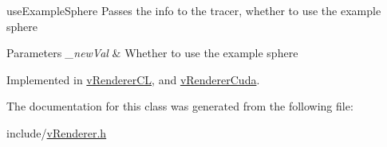 use\-Example\-Sphere Passes the info to the tracer, whether to use the example sphere 


\begin{DoxyParams}{Parameters}
{\em \-\_\-new\-Val} & Whether to use the example sphere \\
\hline
\end{DoxyParams}


Implemented in \hyperlink{classvRendererCL_ace3572b0e58f9ef81ad3853a719d8537}{v\-Renderer\-C\-L}, and \hyperlink{classvRendererCuda_ab552724c473de30893fe9dc21ee2c961}{v\-Renderer\-Cuda}.



The documentation for this class was generated from the following file\-:\begin{DoxyCompactItemize}
\item 
include/\hyperlink{vRenderer_8h}{v\-Renderer.\-h}\end{DoxyCompactItemize}
